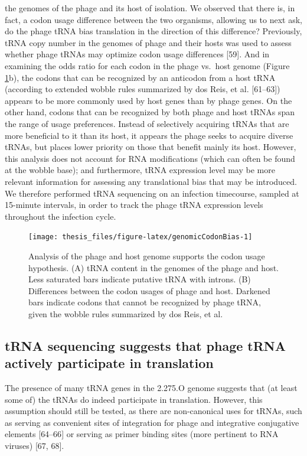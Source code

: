 \documentclass[12pt,twoside]{mitthesis-manusdown}
\begin{document}
the genomes of the phage and its host of isolation. We observed that
there is, in fact, a codon usage difference between the two organisms,
allowing us to next ask, do the phage tRNA bias translation in the
direction of this difference? Previously, tRNA copy number in the
genomes of phage and their hosts was used to assess whether phage tRNAs
may optimize codon usage differences {[}59{]}. And in examining the odds
ratio for each codon in the phage vs.~host genome (Figure
\ref{fig:genomicCodonBias}b), the codons that can be recognized by an
anticodon from a host tRNA (according to extended wobble rules
summarized by dos Reis, et al. {[}61--63{]}) appears to be more commonly
used by host genes than by phage genes. On the other hand, codons that
can be recognized by both phage and host tRNAs span the range of usage
preferences. Instead of selectively acquiring tRNAs that are more
beneficial to it than its host, it appears the phage seeks to acquire
diverse tRNAs, but places lower priority on those that benefit mainly
its host. However, this analysis does not account for RNA modifications
(which can often be found at the wobble base); and furthermore, tRNA
expression level may be more relevant information for assessing any
translational bias that may be introduced. We therefore performed tRNA
sequencing on an infection timecourse, sampled at 15-minute intervals,
in order to track the phage tRNA expression levels throughout the
infection cycle.
\begin{figure}[tb!]

{\centering \texttt{[image: thesis\_files/figure-latex/genomicCodonBias-1]} 

}

\caption{\label{fig:genomicCodonBias}Analysis of the phage and host genome supports the codon usage hypothesis. (A) tRNA content in the genomes of the phage and host. Less saturated bars indicate putative tRNA with introns. (B) Differences between the codon usages of phage and host. Darkened bars indicate codons that cannot be recognized by phage tRNA, given the wobble rules summarized by dos Reis, et al.}\label{fig:genomicCodonBias}
\end{figure}
\subsection{tRNA sequencing suggests that phage tRNA actively
participate in
translation}\label{trna-sequencing-suggests-that-phage-trna-actively-participate-in-translation}

The presence of many tRNA genes in the 2.275.O genome suggests that (at
least some of) the tRNAs do indeed participate in translation. However,
this assumption should still be tested, as there are non-canonical uses
for tRNAs, such as serving as convenient sites of integration for phage
and integrative conjugative elements {[}64--66{]} or serving as primer
binding sites (more pertinent to RNA viruses) {[}67, 68{]}.
\end{document}
